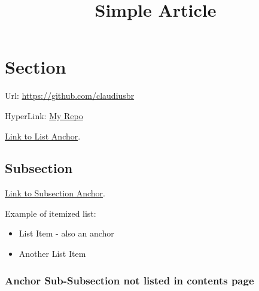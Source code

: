 \documentclass[a4paper,12pt]{article}
\title{Simple Article}
\begin{document}
\maketitle

\tableofcontents
\newpage
	
	
\section{Section} \label{sec:Step2}

  \lipsum[1]

  Url: \url{https://github.com/claudiusbr}

  HyperLink: \href{https://github.com/claudiusbr}{My Repo}

  \hyperref[sec:Step2]{Link to List Anchor}.

	
\subsection{Subsection}

  
  \hyperlink{LinkToSubsection}{Link to Subsection Anchor}.
  
  Example of itemized list:
  \begin{itemize}
          \label{sec:Step2}
          \item
            List Item - also an anchor
          \item
            Another List Item
  \end{itemize}	
	

\hypertarget{LinkToSubsection}{
	\subsubsection*{Anchor Sub-Subsection not listed in contents page}
}
\end{document}
